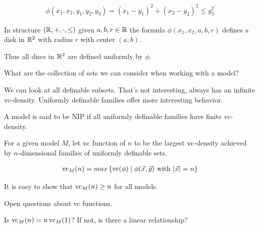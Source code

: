 \documentclass{amsart}
\newcommand{\curly}[1]{\left\{ #1 \right\}}
\begin{document}
\begin{Example}
	\begin{align*}
		\phi(x_1, x_2, y_1, y_2, y_3) = (x_1 - y_1)^2 + (x_2 - y_2)^2 \leq y_3^2
	\end{align*}
\end{Example}

In structure $(\mathbb{R}, +, \cdot, \leq)$ given $a,b,r \in \mathbb{R}$ the formula $\phi(x_1, x_2, a, b, r)$ defines a disk in $\mathbb{R}^2$ with radius $r$ with center $(a,b)$.

Thus all discs in $\mathbb{R}^2$ are defined uniformly by $\phi$.

What are the collection of sets we can consider when working with a model?

We can look at all definable subsets. That's not interesting, always has an infinite vc-density.
Uniformly definable families offer more interesting behavior.

A model is said to be NIP if all uniformly definable families have finite vc-density.

For a given model $M$, let $\operatorname{vc}$ function of $n$ to be the largest $\operatorname{vc}$-density achieved by $n$-dimensional families of uniformly definable sets.

\begin{align*}
	\vc_M(n) = max \curly{ \vc(\phi) \mid \phi(\vec x, \vec y) \text{ with } |\vec x| = n}
\end{align*}

It is easy to show that $\operatorname{vc}_M(n) \geq n$ for all models.

Open questions about vc functions.

Is $\operatorname{vc}_M(n) = n \operatorname{vc}_M(1)$? If not, is there a linear relationship?
\end{document}
